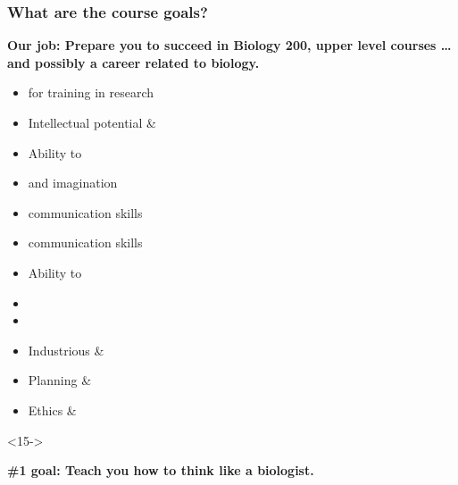 \begin{noheadline}
\begin{frame}
    \frametitle{What are the course goals?}
    \begin{adjustwidth}{-1em}{-1em}
    \begin{center}
        \textbf{Our job: Prepare you to succeed in Biology 200, upper level
            courses \ldots and possibly a career related to biology.} \\

        \vspace{5mm}
    \end{center}
    \end{adjustwidth}

    \begin{adjustwidth}{-2em}{-2em}
    \begin{multicols}{2}
        \begin{itemize}
                \small
            \item<3->  for training in research
            \item<4-> Intellectual potential \& 
            \item<5-> Ability to 
            \item<6->  and imagination
            \item<7->  communication skills
            \item<8->  communication skills
            \item<9-> Ability to 
            \item<10-> 
            \item<11-> 
            \item<12-> Industrious \& 
            \item<13-> Planning \& 
            \item<14-> Ethics \& 
        \end{itemize}
    \end{multicols}

    \begin{uncoverenv}<15->
    \begin{center}
        \textbf{\#1 goal: Teach you how to think like a biologist.}
    \end{center}
    \end{uncoverenv}
    \end{adjustwidth}
\end{frame}
\end{noheadline}


